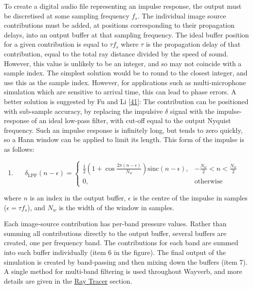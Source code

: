 \documentclass[]{scrreprt}
\providecommand{\tightlist}{%
  \setlength{\itemsep}{0pt}\setlength{\parskip}{0pt}}
\begin{document}
To create a digital audio file representing an impulse response, the
output must be discretised at some sampling frequency \(f_s\). The
individual image source contributions must be added, at positions
corresponding to their propagation delays, into an output buffer at that
sampling frequency. The ideal buffer position for a given contribution
is equal to \(\tau f_s\) where \(\tau\) is the propagation delay of that
contribution, equal to the total ray distance divided by the speed of
sound. However, this value is unlikely to be an integer, and so may not
coincide with a sample index. The simplest solution would be to round to
the closest integer, and use this as the sample index. However, for
applications such as multi-microphone simulation which are sensitive to
arrival time, this can lead to phase errors. A better solution is
suggested by Fu and Li
{[}\protect\hyperlink{ref-fuux5fgpu-basedux5f2016}{41}{]}: The
contribution can be positioned with sub-sample accuracy, by replacing
the impulsive \(\delta\) signal with the impulse-response of an ideal
low-pass filter, with cut-off equal to the output Nyquist frequency.
Such an impulse response is infinitely long, but tends to zero quickly,
so a Hann window can be applied to limit its length. This form of the
impulse is as follows:

\begin{enumerate}
\def\labelenumi{(\arabic{enumi})}
\setcounter{enumi}{4}
\tightlist
\item
  \[
  \delta_{\text{LPF}}(n - \epsilon)=
  \begin{cases}
  \frac{1}{2}(1+\cos\frac{2\pi (n - \epsilon)}{N_w})\text{sinc}(n - \epsilon), & - \frac{N_w}{2} < n < \frac{N_w}{2} \\
  0, & \text{otherwise}
  \end{cases} 
  \]
\end{enumerate}

where \(n\) is an index in the output buffer, \(\epsilon\) is the centre
of the impulse in samples (\(\epsilon=\tau f_s\)), and \(N_w\) is the
width of the window in samples.

Each image-source contribution has per-band pressure values. Rather than
summing all contributions directly to the output buffer, several buffers
are created, one per frequency band. The contributions for each band are
summed into each buffer individually (item 6 in the figure). The final
output of the simulation is created by band-passing and then mixing down
the buffers (item 7). A single method for multi-band filtering is used
throughout Wayverb, and more details are given in the
\href{\%7B\%7B\%20site.baseurl\%20\%7D\%7D\%7B\%\%20link\%20ray_tracer.md\%20\%\%7D}{Ray
Tracer} section.
\end{document}
